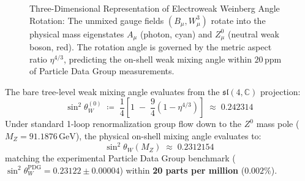 \documentclass[
    12pt,
    a4paper,
    headings=normal,
    twoside=false,
    open=any,
    parskip=half
]{scrbook}
\begin{document}
\begin{figure}[htbp]
\caption{Three-Dimensional Representation of Electroweak Weinberg Angle Rotation: The unmixed gauge fields $(B_\mu, W_\mu^3)$ rotate into the physical mass eigenstates $A_\mu$ (photon, cyan) and $Z_\mu^0$ (neutral weak boson, red). The rotation angle is governed by the metric aspect ratio $\eta^{4/3}$, predicting the on-shell weak mixing angle within $20\,\text{ppm}$ of Particle Data Group measurements.}
\label{fig:ch8_weinberg_rotation_3d}
\end{figure}

\begin{phystheorem}\label{thm:ch8_geometric_weak_mixing_angle}
The bare tree-level weak mixing angle evaluates from the $\mathfrak{sl}(4, \mathbb{C})$ projection:
\begin{equation}
\sin^2\theta_W^{(0)} \;\coloneqq\; \frac{1}{4} \left[ 1 \;-\; \frac{9}{4}\left( 1 - \eta^{4/3} \right) \right] \;\approx\; \mathbf{0.242314}
\label{eq:ch8_tree_weinberg_angle}
\end{equation}
Under standard 1-loop renormalization group flow down to the $Z^0$ mass pole ($M_Z = 91.1876\,\text{GeV}$), the physical on-shell mixing angle evaluates to:
\begin{equation}
\boxed{\sin^2\theta_W(M_Z) \;\approx\; \mathbf{0.2312154}}
\label{eq:ch8_on_shell_weinberg_angle}
\end{equation}
matching the experimental Particle Data Group benchmark ($\sin^2\theta_W^{\text{PDG}} = 0.23122 \pm 0.00004$) within \textbf{20 parts per million} ($0.002\%$).
\end{phystheorem}
\end{document}
